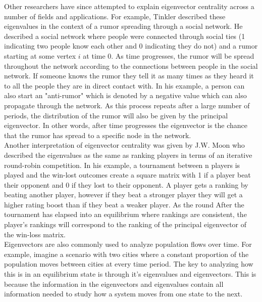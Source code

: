 \documentclass{article}
\theoremstyle{definition}
\theoremstyle{remark}
\begin{document}
Other researchers have since attempted to explain eigenvector centrality across a number of fields and applications.  For example, Tinkler described these eigenvalues in the context of a rumor spreading through a social network.  He described a social network where people were connected through social ties (1 indicating two people know each other and 0 indicating they do not) and a rumor starting at some vertex $i$ at time 0.  As time progresses, the rumor will be spread throughout the network according to the connections between people in the social network.  If someone knows the rumor they tell it as many times as they heard it to all the people they are in direct contact with.  In his example, a person can also start an "anti-rumor" which is denoted by a negative value which can also propagate through the network.  As this process repeats after a large number of periods, the distribution of the rumor will also be given by the principal eigenvector.  In other words, after time progresses the eigenvector is the chance that the rumor has spread to a specific node in the network.\cite{tinkler1972physical} \\

Another interpretation of eigenvector centrality was given by J.W. Moon who described the eigenvalues as the same as ranking players in terms of an iterative round-robin competition.  In his example, a tournament between n players is played and the win-lost outcomes create a square matrix with 1 if a player beat their opponent and 0 if they lost to their opponent.  A player gets a ranking by beating another player, however if they beat a stronger player they will get a higher rating boost than if they beat a weaker player.  As the round After the tournament has elapsed into an equilibrium where rankings are consistent, the player's rankings will correspond to the ranking of the principal eigenvector of the win-loss matrix.\cite{moon1970generalized}\\

Eigenvectors are also commonly used to analyze population flows over time.  For example, imagine a scenario with two cities where a constant proportion of the population moves between cities at every time period.  The key to analyzing how this is in an equilibrium state is through it's eigenvalues and eigenvectors.  This is because the information in the eigenvectors and eigenvalues contain all information needed to study how a system moves from one state to the next.\\
 
\end{document}
